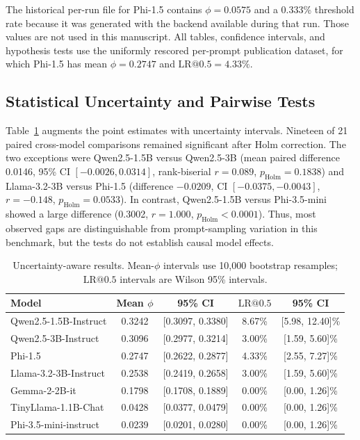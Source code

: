 \documentclass[journal,article,submit,pdftex,moreauthors]{Definitions/mdpi}
\begin{document}
The historical per-run file for Phi-1.5 contains $\phi=0.0575$ and a 0.333\% threshold rate because it was generated with the backend available during that run. Those values are not used in this manuscript. All tables, confidence intervals, and hypothesis tests use the uniformly rescored per-prompt publication dataset, for which Phi-1.5 has mean $\phi=0.2747$ and $\mathrm{LR}@0.5=4.33\%$.

\subsection{Statistical Uncertainty and Pairwise Tests}
Table~\ref{tab:statistical_results} augments the point estimates with uncertainty intervals. Nineteen of 21 paired cross-model comparisons remained significant after Holm correction. The two exceptions were Qwen2.5-1.5B versus Qwen2.5-3B (mean paired difference 0.0146, 95\% CI $[-0.0026,0.0314]$, rank-biserial $r=0.089$, $p_{\mathrm{Holm}}=0.1838$) and Llama-3.2-3B versus Phi-1.5 (difference $-0.0209$, CI $[-0.0375,-0.0043]$, $r=-0.148$, $p_{\mathrm{Holm}}=0.0533$). In contrast, Qwen2.5-1.5B versus Phi-3.5-mini showed a large difference (0.3002, $r=1.000$, $p_{\mathrm{Holm}}<0.0001$). Thus, most observed gaps are distinguishable from prompt-sampling variation in this benchmark, but the tests do not establish causal model effects.

\begin{table}[ht]
\centering
\caption{Uncertainty-aware results. Mean-$\phi$ intervals use 10,000 bootstrap resamples; $\mathrm{LR}@0.5$ intervals are Wilson 95\% intervals.}
\label{tab:statistical_results}
\begin{tabular}{l c c c c}
\toprule
Model & Mean $\phi$ & 95\% CI & $\mathrm{LR}@0.5$ & 95\% CI \\
\midrule
Qwen2.5-1.5B-Instruct & 0.3242 & [0.3097, 0.3380] & 8.67\% & [5.98, 12.40]\% \\
Qwen2.5-3B-Instruct & 0.3096 & [0.2977, 0.3214] & 3.00\% & [1.59, 5.60]\% \\
Phi-1.5 & 0.2747 & [0.2622, 0.2877] & 4.33\% & [2.55, 7.27]\% \\
Llama-3.2-3B-Instruct & 0.2538 & [0.2419, 0.2658] & 3.00\% & [1.59, 5.60]\% \\
Gemma-2-2B-it & 0.1798 & [0.1708, 0.1889] & 0.00\% & [0.00, 1.26]\% \\
TinyLlama-1.1B-Chat & 0.0428 & [0.0377, 0.0479] & 0.00\% & [0.00, 1.26]\% \\
Phi-3.5-mini-instruct & 0.0239 & [0.0201, 0.0280] & 0.00\% & [0.00, 1.26]\% \\
\bottomrule
\end{tabular}
\end{table}
\end{document}
